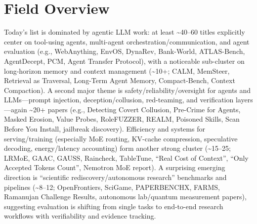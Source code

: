 \documentclass[12pt,letterpaper]{article}
\begin{document}
\section*{Field Overview}
{\footnotesize Today's list is dominated by agentic LLM work: at least \textasciitilde{}40--60 titles explicitly center on tool-using agents, multi-agent orchestration/communication, and agent evaluation (e.g., WebAnything, EnvOS, DynaRev, Bank-World, ATLAS-Bench, AgentDecept, PCM, Agent Transfer Protocol), with a noticeable sub-cluster on long-horizon memory and context management (\textasciitilde{}10+; CALM, MemSteer, Retrieval as Traversal, Long-Term Agent Memory, Compact-Bench, Context Compaction). A second major theme is safety/reliability/oversight for agents and LLMs---prompt injection, deception/collusion, red-teaming, and verification layers---again \textasciitilde{}20+ papers (e.g., Detecting Covert Collusion, Pre-Crime for Agents, Masked Erosion, Value Probes, RoleFUZZER, REALM, Poisoned Skills, Scan Before You Install, jailbreak discovery). Efficiency and systems for serving/training (especially MoE routing, KV-cache compression, speculative decoding, energy/latency accounting) form another strong cluster (\textasciitilde{}15--25; LRMoE, GAAC, GAUSS, Raincheck, TableTune, ``Real Cost of Context'', ``Only Accepted Tokens Count'', Nemotron MoE report). A surprising emerging direction is ``scientific rediscovery/autonomous research'' benchmarks and pipelines (\textasciitilde{}8--12; OpenFrontiers, SciGame, PAPERBENCHX, FARMS, Ramanujan Challenge Results, autonomous lab/quantum measurement papers), suggesting evaluation is shifting from single tasks to end-to-end research workflows with verifiability and evidence tracking.}
\end{document}
